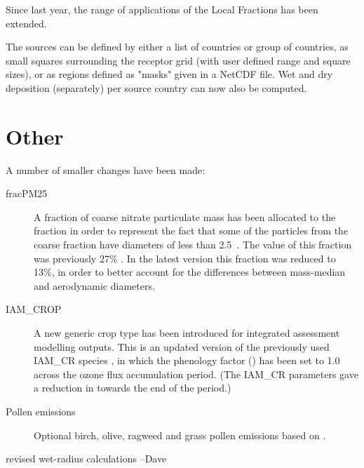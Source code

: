 Since last year, the range of applications of the Local Fractions has been extended.

The sources can be defined by either a list of countries or group of countries, as small squares surrounding the receptor grid (with user defined range and square sizes), or as regions defined as "masks" given in a NetCDF file.
Wet and dry deposition (separately) per source country can now also be computed.



\section{Other}
\label{sec:updateOther}

A number of smaller changes have been made:

\begin{description}
  \item[fracPM25] A fraction of coarse nitrate particulate mass has been allocated to the \PM[2.5] fraction in order to represent the fact that some of the particles from the coarse fraction have diameters of less than 2.5~\um. The value of this fraction was previously 27\% \citep{Simpson:EMEP2012}. In the latest version this fraction was reduced to 13\%, in order to better account for the differences between mass-median and aerodynamic diameters.
  \item[IAM\_CROP] A new generic crop type has been introduced for integrated assessment modelling outputs. This is an updated version of the previously used IAM\_CR species \citep{Simpson:EMEP2012}, in which the phenology factor (\fphen) has been set to 1.0 across the ozone flux accumulation period. (The IAM\_CR parameters gave a reduction in \fphen towards the end of the period.)
  \item[Pollen emissions] Optional birch, olive, ragweed and grass pollen emissions based on \citet{Sofiev-2015,Sofiev-2017}.
\end{description}


revised wet-radius calculations --Dave




\clearpage
\renewcommand\bibname{References}      %

